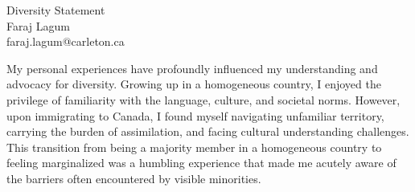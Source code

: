 \documentclass[11pt]{article}
\newcommand{\ignore}[1]{}
\begin{document}
\begin{center}
{\Large Diversity Statement} \\[.3in]
{\large Faraj Lagum}\\
faraj.lagum@carleton.ca \\

\ignore
{
\vspace*{.5in}
{``\emph{Education is not the learning of facts, but the training of minds to think.}'' \\ ---Albert Einstein.}
}

\end{center}









My personal experiences have profoundly influenced my understanding and advocacy for diversity. Growing up in a homogeneous country, I enjoyed the privilege of familiarity with the language, culture, and societal norms. However, upon immigrating to Canada, I found myself navigating unfamiliar territory, carrying the burden of assimilation, and facing cultural understanding challenges. This transition from being a majority member in a homogeneous country to feeling marginalized was a humbling experience that made me acutely aware of the barriers often encountered by visible minorities.
\end{document}
